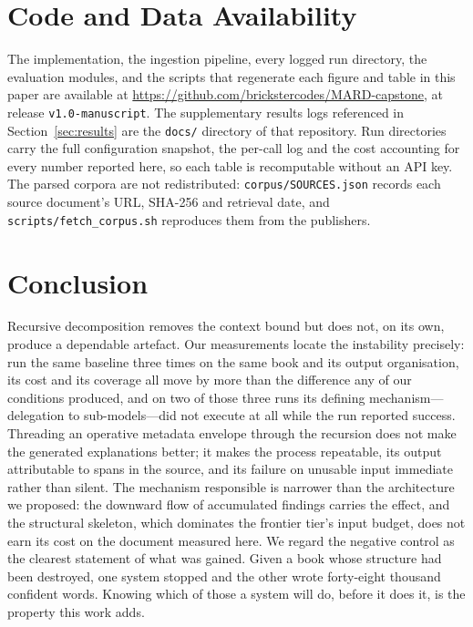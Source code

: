\documentclass[conference]{IEEEtran}
\begin{document}

\section*{Code and Data Availability}
The implementation, the ingestion pipeline, every logged run directory, the
evaluation modules, and the scripts that regenerate each figure and table in
this paper are available at
\url{https://github.com/brickstercodes/MARD-capstone}, at release
\texttt{v1.0-manuscript}. The supplementary results logs referenced in
Section~\ref{sec:results} are the \texttt{docs/} directory of that repository.
Run directories carry the full configuration snapshot, the per-call log and
the cost accounting for every number reported here, so each table is
recomputable without an API key. The parsed corpora are not redistributed:
\texttt{corpus/SOURCES.json} records each source document's URL, SHA-256 and
retrieval date, and \texttt{scripts/fetch\_corpus.sh} reproduces them from the
publishers.

\section{Conclusion}
\label{sec:conclusion}
Recursive decomposition removes the context bound but does not, on its own,
produce a dependable artefact. Our measurements locate the instability
precisely: run the same baseline three times on the same book and its output
organisation, its cost and its coverage all move by more than the difference
any of our conditions produced, and on two of those three runs its defining
mechanism---delegation to sub-models---did not execute at all while the run
reported success. Threading an operative metadata envelope through the
recursion does not make the generated explanations better; it makes the
process repeatable, its output attributable to spans in the source, and its
failure on unusable input immediate rather than silent. The mechanism
responsible is narrower than the architecture we proposed: the downward flow
of accumulated findings carries the effect, and the structural skeleton, which
dominates the frontier tier's input budget, does not earn its cost on the
document measured here. We regard the negative control as the clearest
statement of what was gained. Given a book whose structure had been
destroyed, one system stopped and the other wrote forty-eight thousand
confident words. Knowing which of those a system will do, before it does it,
is the property this work adds.
\end{document}
